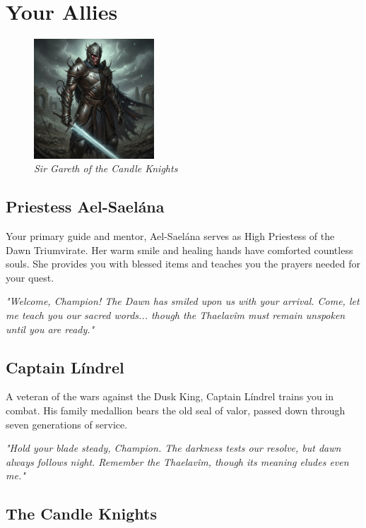 \documentclass[11pt,a4paper,twoside]{book}
\begin{document}
\section{Your Allies}

\begin{figure}
    \centering
    \includegraphics[width=0.4\textwidth]{images/candle_knight_2025-09-03T22-23-00-355Z_1.png}
    \caption*{\small\textit{Sir Gareth of the Candle Knights}}
\end{figure}

\subsection{Priestess Ael-Saelána}

Your primary guide and mentor, Ael-Saelána serves as High Priestess of the Dawn Triumvirate. Her warm smile and healing hands have comforted countless souls. She provides you with blessed items and teaches you the prayers needed for your quest.

\textit{"Welcome, Champion! The Dawn has smiled upon us with your arrival. Come, let me teach you our sacred words... though the Thaelavîm must remain unspoken until you are ready."}

\subsection{Captain Líndrel}

A veteran of the wars against the Dusk King, Captain Líndrel trains you in combat. His family medallion bears the old seal of valor, passed down through seven generations of service.

\textit{"Hold your blade steady, Champion. The darkness tests our resolve, but dawn always follows night. Remember the Thaelavîm, though its meaning eludes even me."}

\subsection{The Candle Knights}
\end{document}
